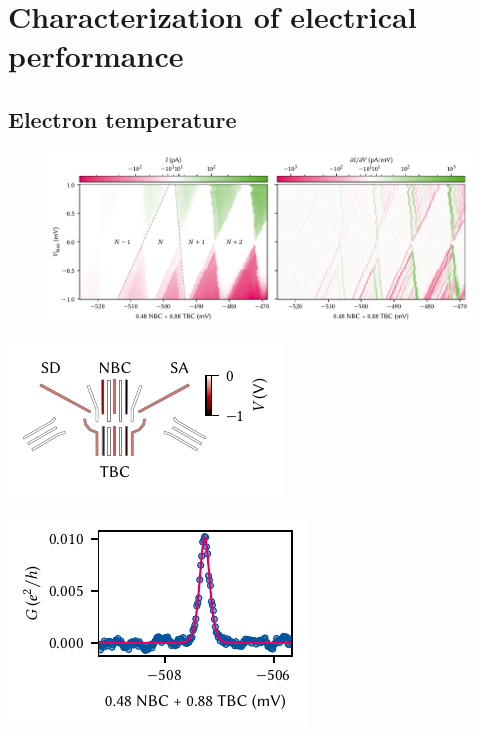 \chapter{Characterization of electrical performance}\label{ch:setup:electrical}

\section{Electron temperature}\label{sec:setup:electrical:etemp}
\begin{figure}
    \centering
    \includegraphics{img/pdf/setup/diamonds}
    \caption[]{}
    \label{fig:setup:electrical:diamonds}
\end{figure}

\begin{marginfigure}
    \centering
    \includegraphics{img/pdf/setup/diamonds_gl}
    \caption[]{}
    \label{fig:setup:electrical:gl}
\end{marginfigure}

\begin{marginfigure}
    \centering
    \includegraphics{img/pdf/setup/coulomb_resonance}
    \caption[]{}
    \label{fig:setup:electrical:resonance}
\end{marginfigure}
